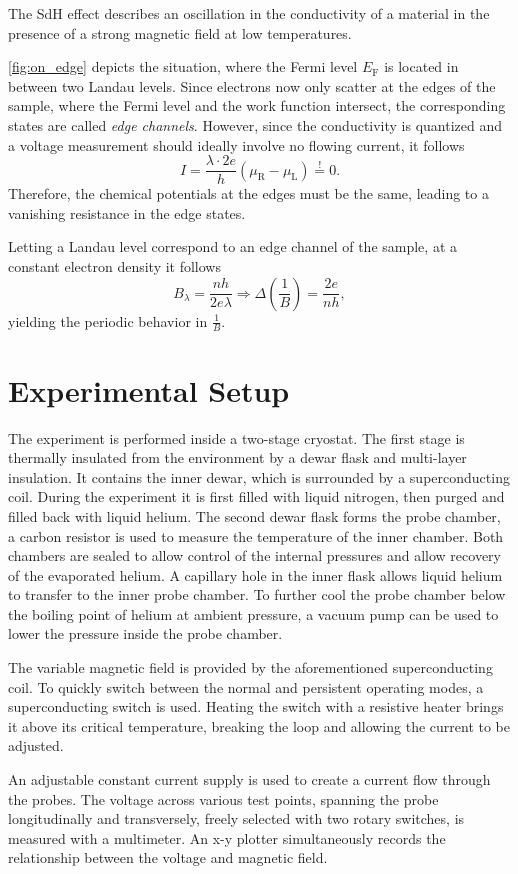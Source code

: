 The SdH effect describes an oscillation in the conductivity of a material in the presence of a strong magnetic field at low temperatures.

\autoref{fig:on_edge} depicts the situation, where the Fermi level $E_\text{F}$ is located in between two Landau levels.
Since electrons now only scatter at the edges of the sample, where the Fermi level and the work function intersect, the corresponding states are called \textit{edge channels}.
However, since the conductivity is quantized and a voltage measurement should ideally involve no flowing current, it follows
\begin{equation*}
	I = \frac{\lambda\cdot 2e}{h}(\mu_\text{R} - \mu_\text{L}) \stackrel{!}{=} 0.
\end{equation*}
Therefore, the chemical potentials at the edges must be the same, leading to a vanishing resistance in the edge states.

Letting a Landau level correspond to an edge channel of the sample, at a constant electron density it follows
\begin{equation*}
	B_\lambda = \frac{nh}{2e\lambda}\Rightarrow \Delta\left(\frac{1}{B}\right) = \frac{2e}{nh},
\end{equation*}
yielding the periodic behavior in $\frac{1}{B}$.

\section{Experimental Setup}
The experiment is performed inside a two-stage cryostat.
The first stage is thermally insulated from the environment by a dewar flask and multi-layer insulation.
It contains the inner dewar, which is surrounded by a superconducting coil.
During the experiment it is first filled with liquid nitrogen, then purged and filled back with liquid helium.
The second dewar flask forms the probe chamber, a carbon resistor is used to measure the temperature of the inner chamber.
Both chambers are sealed to allow control of the internal pressures and allow recovery of the evaporated helium.
A capillary hole in the inner flask allows liquid helium to transfer to the inner probe chamber.
To further cool the probe chamber below the boiling point of helium at ambient pressure, a vacuum pump can be used to lower the pressure inside the probe chamber.

The variable magnetic field is provided by the aforementioned superconducting coil.
To quickly switch between the normal and persistent operating modes, a superconducting switch is used.
Heating the switch with a resistive heater brings it above its critical temperature, breaking the loop and allowing the current to be adjusted.

An adjustable constant current supply is used to create a current flow through the probes.
The voltage across various test points, spanning the probe longitudinally and transversely, freely selected with two rotary switches, is measured with a multimeter.
An x-y plotter simultaneously records the relationship between the voltage and magnetic field.
